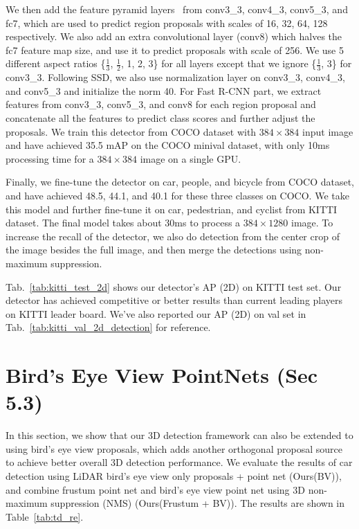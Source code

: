 We then add the feature pyramid layers~\cite{lin2016feature} from conv3\_3, conv4\_3, conv5\_3, and fc7, which are used to predict region proposals with scales of 16, 32, 64, 128 respectively. We also add an extra convolutional layer (conv8) which halves the fc7 feature map size, and use it to predict proposals with scale of 256. We use 5 different aspect ratios \{$\frac{1}{3}$, $\frac{1}{2}$, 1, 2, 3\} for all layers except that we ignore \{$\frac{1}{3}$, 3\} for conv3\_3. Following SSD, we also use normalization layer on conv3\_3, conv4\_3, and conv5\_3 and initialize the norm 40. For Fast R-CNN part, we extract features from conv3\_3, conv5\_3, and conv8 for each region proposal and concatenate all the features to predict class scores and further adjust the proposals. We train this detector from COCO dataset with $384\times384$ input image and have achieved 35.5 mAP on the COCO minival dataset, with only 10ms processing time for a $384\times384$ image on a single GPU.

Finally, we fine-tune the detector on car, people, and bicycle from COCO dataset, and have achieved 48.5, 44.1, and 40.1 for these three classes on COCO. We take this model and further fine-tune it on car, pedestrian, and cyclist from KITTI dataset. The final model takes about 30ms to process a $384\times1280$ image. To increase the recall of the detector, we also do detection from the center crop of the image besides the full image, and then merge the detections using non-maximum suppression.

Tab.~\ref{tab:kitti_test_2d} shows our detector's AP (2D) on KITTI test set. Our detector has achieved competitive or better results than current leading players on KITTI leader board. We've also reported our AP (2D) on val set in Tab.~\ref{tab:kitti_val_2d_detection} for reference.



\section{Bird's Eye View PointNets (Sec 5.3)}
\label{sec:supp_bv}

In this section, we show that our 3D detection framework can also be extended to using bird's eye view proposals, which adds another orthogonal proposal source to achieve better overall 3D detection performance. We evaluate the results of car detection using LiDAR bird's eye view only proposals + point net (Ours(BV)), and combine frustum point net and bird's eye view point net using 3D non-maximum suppression (NMS) (Ours(Frustum + BV)). The results are shown in Table~\ref{tab:td_re}.

